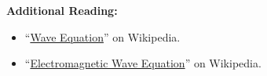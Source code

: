 

{\bf Additional Reading:}
\begin{itemize}
\item ``\href{https://en.wikipedia.org/wiki/Wave_equation}{Wave Equation}'' on Wikipedia.
\item ``\href{https://en.wikipedia.org/wiki/Electromagnetic_wave_equation}{Electromagnetic Wave Equation}'' on Wikipedia.
\end{itemize}




